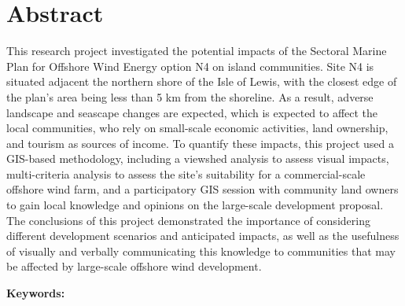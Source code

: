 \chapter*{Abstract}

This research project investigated the potential impacts of the Sectoral Marine Plan for Offshore Wind Energy option N4 on island communities. Site N4 is situated adjacent the northern shore of the Isle of Lewis, with the closest edge of the plan's area being less than 5 km from the shoreline. As a result, adverse landscape and seascape changes are expected, which is expected to affect the local communities, who rely on small-scale economic activities, land ownership, and tourism as sources of income. To quantify these impacts, this project used a GIS-based methodology, including a viewshed analysis to assess visual impacts, multi-criteria analysis to assess the site's suitability for a commercial-scale offshore wind farm, and a participatory GIS session with community land owners to gain local knowledge and opinions on the large-scale development proposal. The conclusions of this project demonstrated the importance of considering different development scenarios and anticipated impacts, as well as the usefulness of visually and verbally communicating this knowledge to communities that may be affected by large-scale offshore wind development.

\noindent\textbf{Keywords:} \keywords
